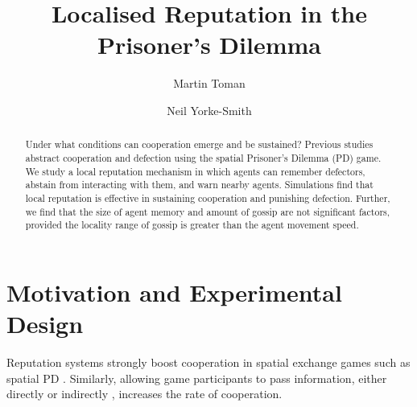 \documentclass[runningheads]{llncs}
\begin{document}
%
\title{Localised Reputation in the Prisoner's Dilemma}
%
%
\author{
Martin Toman \and
Neil Yorke-Smith\\
}
%
%
%
\maketitle              %
%
%
%
\begin{abstract}
Under what conditions can cooperation emerge and be sustained?
Previous studies abstract cooperation and defection using the spatial Prisoner's Dilemma (PD) game.
We study a local reputation mechanism in which agents can remember defectors, abstain from interacting with them, and warn nearby agents.
Simulations find that local reputation is effective in sustaining cooperation and punishing defection.
Further, we find that the size of agent memory and amount of gossip are not significant factors, provided the locality range of gossip is greater than the agent movement speed.
%
\end{abstract}



\section{Motivation and Experimental Design}

Reputation systems strongly boost cooperation in spatial exchange games such as spatial PD \cite{simple-reputation, dong-reputation}.
Similarly, allowing game participants to pass information, either directly \cite{cooperation-communication} or indirectly \cite{public-private-monitoring}, increases the rate of cooperation.
\end{document}
